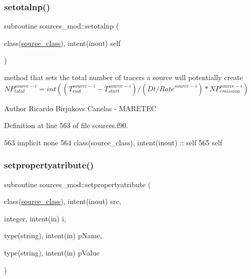 \subsubsection{\texorpdfstring{setotalnp()}{setotalnp()}}
{\footnotesize\ttfamily subroutine sources\+\_\+mod\+::setotalnp (\begin{DoxyParamCaption}\item[{class(\mbox{\hyperlink{structsources__mod_1_1source__class}{source\+\_\+class}}), intent(inout)}]{self }\end{DoxyParamCaption})\hspace{0.3cm}{\ttfamily [private]}}



method that sets the total number of tracers a source will potentially create ${NP}_{total}^{source-i}=int((T_{end}^{source-i}-T_{start}^{source-i})/(Dt/{Rate}^{source-i})*{NP}_{emission}^{source-i})$ 

\begin{DoxyAuthor}{Author}
Ricardo Birjukovs Canelas -\/ M\+A\+R\+E\+T\+EC 
\end{DoxyAuthor}


Definition at line 563 of file sources.\+f90.


\begin{DoxyCode}
563     \textcolor{keywordtype}{implicit none}
564     \textcolor{keywordtype}{class}(source\_class), \textcolor{keywordtype}{intent(inout)} :: self
565     self%
\end{DoxyCode}
\mbox{\label{namespacesources__mod_a2b7d1a3856735fdb0fb4ff142e38668d}} 
\subsubsection{\texorpdfstring{setpropertyatribute()}{setpropertyatribute()}}
{\footnotesize\ttfamily subroutine sources\+\_\+mod\+::setpropertyatribute (\begin{DoxyParamCaption}\item[{class(\mbox{\hyperlink{structsources__mod_1_1source__class}{source\+\_\+class}}), intent(inout)}]{src,  }\item[{integer, intent(in)}]{i,  }\item[{type(string), intent(in)}]{p\+Name,  }\item[{type(string), intent(in)}]{p\+Value }\end{DoxyParamCaption})\hspace{0.3cm}{\ttfamily [private]}}



